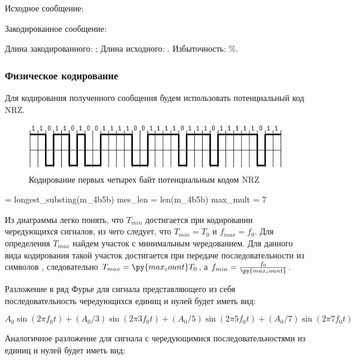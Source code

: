 \documentclass[12pt, a4paper]{article}
\begin{document}
Исходное сообщение:\\

Закодированное сообщение:\\

Длина закодированного: ; Длина исходного: .
Избыточность: \%.

\subsubsection*{Физическое кодирование}

Для кодирования полученного сообщения будем использовать потенциальный код NRZ.

\begin{figure}[h]
  \begin{center}
    \includegraphics{nrz_4b5b}
    \caption{Кодирование первых четырех байт потенциальным кодом NRZ}
  \end{center}
\end{figure}

\begin{pycode}
 = longest_substing(m_4b5b)
mes_len = len(m_4b5b)
max_mult = 7
\end{pycode}

Из диаграммы легко понять, что $T_{min}$ достигается при кодировании чередующихся
сигналов, из чего следует, что $T_{min} = T_0$ и $f_{max} = f_0$. Для определения
$T_{max}$ найдем участок с минимальным чередованием. Для данного вида кодирования
такой участок достигается при передаче последовательности из 
символов \texttt{},
следовательно $T_{max} = \py{max_count} T_0$, а $f_{min} = \frac{f_0}{\py{max_count}}$.

Разложение в ряд Фурье для сигнала представляющего из себя последовательность
чередующихся единиц и нулей будет иметь вид:

$$A_0 \sin(2 \pi f_0 t) + (A_0 / 3) \sin(2 \pi 3 f_0 t) +
  (A_0 / 5) \sin(2 \pi 5 f_0 t) + (A_0 / 7) \sin(2 \pi 7 f_0 t)$$

Аналогичное разложение для сигнала с чередующимися последовательностями из
 единиц и нулей будет иметь вид:
\end{document}
